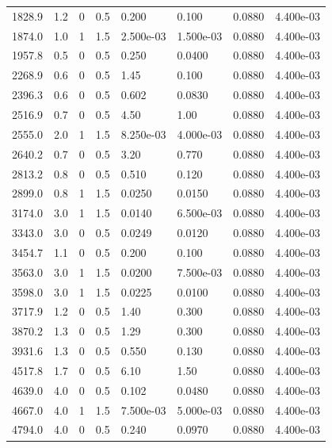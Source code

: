 \documentclass[preview]{standalone}
\begin{document}
{{\begin{tabular}{L{1.2cm}C{1.2cm} C{0.3cm}C{0.5cm} C{1.4cm}C{1.4cm} C{1.4cm}C{1.4cm}}
  1828.9  &   1.2  & 0     & 0.5 &  0.200  & 0.100  & 0.0880 &  4.400e-03   \\ 
  1874.0  &   1.0  & 1     & 1.5 &  2.500e-03  & 1.500e-03  & 0.0880 &  4.400e-03   \\ 
  1957.8  &   0.5  & 0     & 0.5 &  0.250  & 0.0400  & 0.0880 &  4.400e-03   \\ 
  2268.9  &   0.6  & 0     & 0.5 &  1.45  & 0.100  & 0.0880 &  4.400e-03   \\ 
  2396.3  &   0.6  & 0     & 0.5 &  0.602  & 0.0830  & 0.0880 &  4.400e-03   \\ 
  2516.9  &   0.7  & 0     & 0.5 &  4.50  & 1.00  & 0.0880 &  4.400e-03   \\ 
  2555.0  &   2.0  & 1     & 1.5 &  8.250e-03  & 4.000e-03  & 0.0880 &  4.400e-03   \\ 
  2640.2  &   0.7  & 0     & 0.5 &  3.20  & 0.770  & 0.0880 &  4.400e-03   \\ 
  2813.2  &   0.8  & 0     & 0.5 &  0.510  & 0.120  & 0.0880 &  4.400e-03   \\ 
  2899.0  &   0.8  & 1     & 1.5 &  0.0250  & 0.0150  & 0.0880 &  4.400e-03   \\ 
  3174.0  &   3.0  & 1     & 1.5 &  0.0140  & 6.500e-03  & 0.0880 &  4.400e-03   \\ 
  3343.0  &   3.0  & 0     & 0.5 &  0.0249  & 0.0120  & 0.0880 &  4.400e-03   \\ 
  3454.7  &   1.1  & 0     & 0.5 &  0.200  & 0.100  & 0.0880 &  4.400e-03   \\ 
  3563.0  &   3.0  & 1     & 1.5 &  0.0200  & 7.500e-03  & 0.0880 &  4.400e-03   \\ 
  3598.0  &   3.0  & 1     & 1.5 &  0.0225  & 0.0100  & 0.0880 &  4.400e-03   \\ 
  3717.9  &   1.2  & 0     & 0.5 &  1.40  & 0.300  & 0.0880 &  4.400e-03   \\ 
  3870.2  &   1.3  & 0     & 0.5 &  1.29  & 0.300  & 0.0880 &  4.400e-03   \\ 
  3931.6  &   1.3  & 0     & 0.5 &  0.550  & 0.130  & 0.0880 &  4.400e-03   \\ 
  4517.8  &   1.7  & 0     & 0.5 &  6.10  & 1.50  & 0.0880 &  4.400e-03   \\ 
  4639.0  &   4.0  & 0     & 0.5 &  0.102  & 0.0480  & 0.0880 &  4.400e-03   \\ 
  4667.0  &   4.0  & 1     & 1.5 &  7.500e-03  & 5.000e-03  & 0.0880 &  4.400e-03   \\ 
  4794.0  &   4.0  & 0     & 0.5 &  0.240  & 0.0970  & 0.0880 &  4.400e-03   \\ 

\end{tabular}}}
\end{document}
